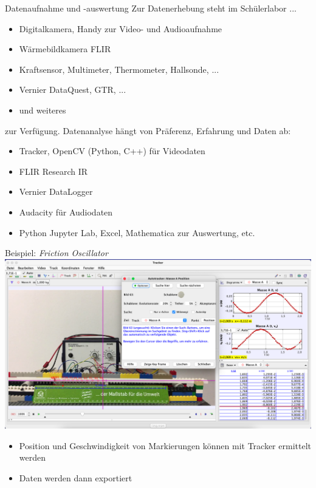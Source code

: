 \documentclass[9pt]{beamer}
\begin{document}
\begin{frame}{Datenaufnahme und -auswertung}
  Zur Datenerhebung steht im Schülerlabor ...
  \begin{itemize}
    \item Digitalkamera, Handy zur Video- und Audioaufnahme
    \item Wärmebildkamera FLIR
    \item Kraftsensor, Multimeter, Thermometer, Hallsonde, ...
    \item Vernier DataQuest, GTR, ...
    \item und weiteres
  \end{itemize}
  zur Verfügung.
  \vfill
  \pause
  Datenanalyse hängt von Präferenz, Erfahrung und Daten ab:
  \begin{itemize}
    \item Tracker, OpenCV (Python, C++) für Videodaten
    \item FLIR Research IR
    \item Vernier DataLogger
    \item Audacity für Audiodaten
    \item Python Jupyter Lab, Excel, Mathematica zur Auswertung, etc.
  \end{itemize}
\end{frame}

\begin{frame}{Beispiel: \emph{Friction Oscillator}}
  \includegraphics[width=\textwidth]{photos/screenshot}
  \begin{itemize}
    \item Position und Geschwindigkeit von Markierungen können mit Tracker ermittelt werden
    \item Daten werden dann exportiert
  \end{itemize}
\end{frame}
\end{document}
